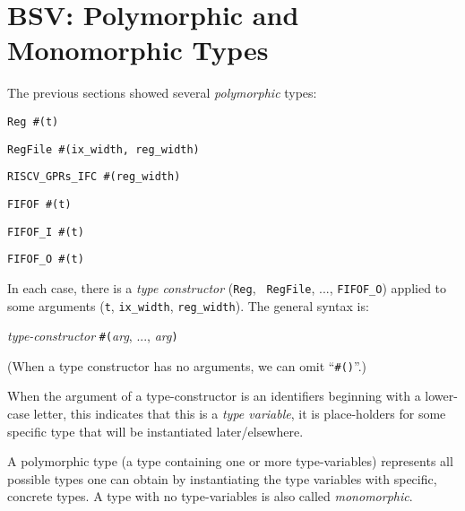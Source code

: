 
\section{BSV: Polymorphic and Monomorphic Types}

\label{Sec_Polymorphic_Types}



The previous sections showed several \emph{polymorphic} types:

{\small
\begin{tightlist}
 \item \verb|Reg #(t)|
 \item \verb|RegFile #(ix_width, reg_width)|
 \item \verb|RISCV_GPRs_IFC #(reg_width)|
 \item \verb|FIFOF #(t)|
 \item \verb|FIFOF_I #(t)|
 \item \verb|FIFOF_O #(t)|
\end{tightlist}
}

In each case, there is a \emph{type constructor} ({\tt Reg}, {\tt
RegFile}, ..., {\tt FIFOF\_O}) applied to some arguments ({\tt t},
{\tt ix\_width}, {\tt reg\_width}).  The general syntax is:

\begin{tabbing}
\hmm \emph{type-constructor} {\tt \#(}\emph{arg}, ..., \emph{arg}{\tt )}
\end{tabbing}

(When a type constructor has no arguments, we can omit ``{\tt \#()}''.)

When the argument of a type-constructor is an identifiers beginning
with a lower-case letter, this indicates that this is a \emph{type
variable}, {\ie} it is place-holders for some specific type that will
be instantiated later/elsewhere.

A polymorphic type (a type containing one or more type-variables)
represents all possible types one can obtain by instantiating the type
variables with specific, concrete types.  A type with no
type-variables is also called \emph{monomorphic}.

